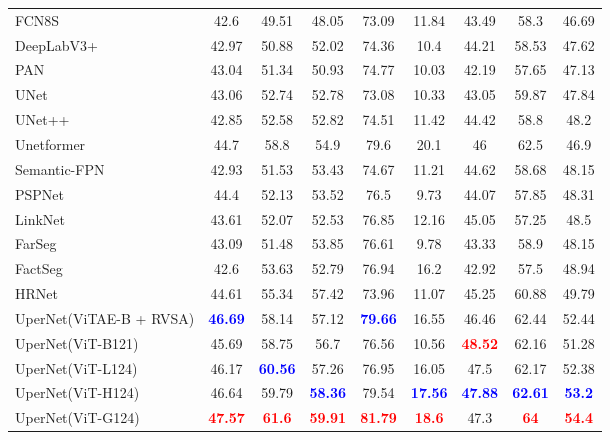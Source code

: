 \begin{table*}[t]{\textwidth=0mm}
{\begin{tabular}{l|c c c c c c c | c}
        FCN8S \cite{long2015fully} & 42.6 & 49.51 & 48.05 & 73.09 & 11.84 & 43.49 & 58.3 & 46.69 \\
        DeepLabV3+ \cite{chen2018encoder} & 42.97 & 50.88 & 52.02 & 74.36 & 10.4 & 44.21 & 58.53 & 47.62 \\
        PAN \cite{li2018pyramid} & 43.04 & 51.34 & 50.93 & 74.77 & 10.03 & 42.19 & 57.65 & 47.13 \\
        UNet \cite{ronneberger2015u} & 43.06 & 52.74 & 52.78 & 73.08 & 10.33 & 43.05 & 59.87 & 47.84 \\
        UNet++ \cite{zhou2018unet++} & 42.85 & 52.58 & 52.82 & 74.51 & 11.42 & 44.42 & 58.8 & 48.2 \\
        Unetformer \cite{wang2022unetformer} & 44.7 & 58.8 & 54.9 & 79.6 & 20.1 & 46 & 62.5 & 46.9 \\
        Semantic-FPN \cite{kirillov2019panoptic} & 42.93 & 51.53 & 53.43 & 74.67 & 11.21 & 44.62 & 58.68 & 48.15 \\
        PSPNet \cite{zhao2017pyramid} & 44.4 & 52.13 & 53.52 & 76.5 & 9.73 & 44.07 & 57.85 & 48.31 \\
        LinkNet \cite{chaurasia2017linknet} & 43.61 & 52.07 & 52.53 & 76.85 & 12.16 & 45.05 & 57.25 & 48.5 \\
        FarSeg \cite{zheng2020foreground} & 43.09 & 51.48 & 53.85 & 76.61 & 9.78 & 43.33 & 58.9 & 48.15 \\
        FactSeg \cite{ma2021factseg} & 42.6 & 53.63 & 52.79 & 76.94 & 16.2 & 42.92 & 57.5 & 48.94 \\
        HRNet \cite{wang2020deep} & 44.61 & 55.34 & 57.42 & 73.96 & 11.07 & 45.25 & 60.88 & 49.79 \\
        UperNet(ViTAE-B + RVSA) \cite{wang2022advancing} & \textbf{\textcolor{blue}{46.69}} & 58.14 & 57.12 & \textbf{\textcolor{blue}{79.66}} & 16.55 & 46.46 & 62.44 & 52.44 \\ \hline
        UperNet(ViT-B121)\cite{wang2022advancing} & 45.69 & 58.75 & 56.7 & 76.56 & 10.56 & \textbf{\textcolor{red}{48.52}} & 62.16 & 51.28 \\
        UperNet(ViT-L124) & 46.17 & \textbf{\textcolor{blue}{60.56}} & 57.26 & 76.95 & 16.05 & 47.5 & 62.17 & 52.38 \\
        UperNet(ViT-H124) & 46.64 & 59.79 & \textbf{\textcolor{blue}{58.36}} & 79.54 & \textbf{\textcolor{blue}{17.56}} & \textbf{\textcolor{blue}{47.88}} & \textbf{\textcolor{blue}{62.61}} & \textbf{\textcolor{blue}{53.2}} \\
        UperNet(ViT-G124) & \textbf{\textcolor{red}{47.57}} & \textbf{\textcolor{red}{61.6}} & \textbf{\textcolor{red}{59.91}} & \textbf{\textcolor{red}{81.79}} & \textbf{\textcolor{red}{18.6}} & 47.3 & \textbf{\textcolor{red}{64}} & \textbf{\textcolor{red}{54.4}} \\ \hline
       

    \end{tabular}
    }
    \label{tab:loveda table}
\end{table*} 
